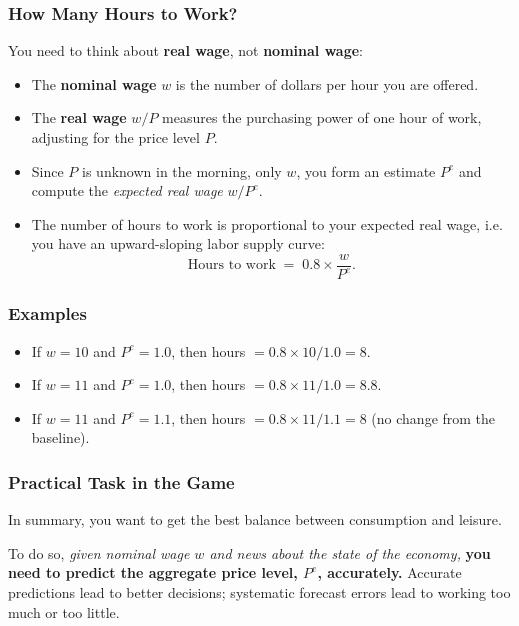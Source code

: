 \documentclass[a4paper,11pt]{article}%
\begin{document}
\begin{mdframed}[linewidth=1pt,roundcorner=5pt,backgroundcolor=gray!5]
\subsubsection*{How Many Hours to Work?}
You need to think about \textbf{real wage}, not \textbf{nominal wage}:
\begin{itemize}
  \item The \textbf{nominal wage} $w$ is the number of dollars per hour you are offered.
  \item The \textbf{real wage} $w/P$ measures the purchasing power of one hour of work, adjusting for the price level $P$.
  \item Since $P$ is unknown in the morning, only $w$, you form an estimate $P^e$ and compute the \emph{expected real wage} $w/P^e$.
  \item The number of hours to work is proportional to your expected real wage, i.e. you have an upward-sloping labor supply curve:
  \[
  \text{Hours to work} \;=\; 0.8 \times \frac{w}{P^e}.
  \]
\end{itemize}

\subsubsection*{Examples}
\begin{itemize}
  \item If $w = 10$ and $P^e = 1.0$, then hours $= 0.8\times 10/1.0 = 8$.
  \item If $w = 11$ and $P^e = 1.0$, then hours $= 0.8\times 11/1.0 = 8.8$.
  \item If $w = 11$ and $P^e = 1.1$, then hours $= 0.8\times 11/1.1 = 8$ (no change from the baseline).
\end{itemize}

\subsubsection*{Practical Task in the Game}

In summary, you want to get the best balance between consumption and leisure.
\bigskip

To do so, \textit{given nominal wage $w$ and news about the state of the economy,} \textbf{you need to predict the aggregate price level, $P^e$, accurately.} Accurate predictions lead to better decisions; systematic forecast errors lead to working too much or too little.


\end{mdframed}
\end{document}
